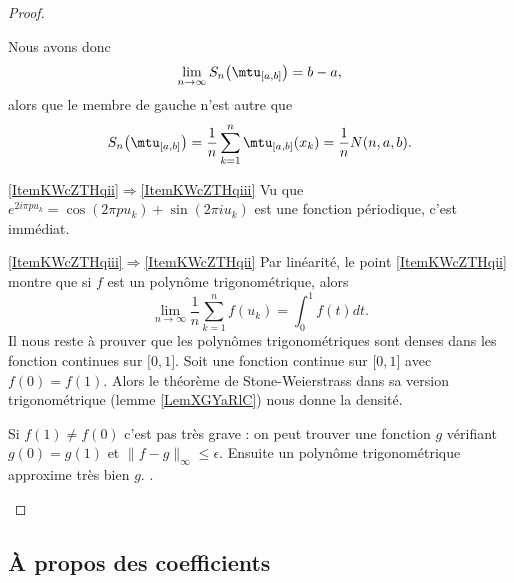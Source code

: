 \begin{proof}
\begin{subproof}
    Nous avons donc
    \begin{equation}
        \lim_{n\to \infty} S_n\big( \mtu_{\mathopen[ a , b \mathclose]} \big)=b-a,
    \end{equation}
    alors que le membre de gauche n'est autre que
    \begin{equation}
        S_n\big( \mtu_{\mathopen[ a , b \mathclose]} \big)=\frac{1}{ n }\sum_{k=1}^n\mtu_{\mathopen[ a , b \mathclose]}(x_k)=\frac{1}{ n }N(n,a,b).
    \end{equation}
    \item[\ref{ItemKWcZTHqii}\( \Rightarrow\)\ref{ItemKWcZTHqiii}]
        Vu que \(  e^{2i\pi pu_k}=\cos(2\pi pu_k)+\sin(2\pi iu_k)\) est une fonction périodique, c'est immédiat.
    \item[\ref{ItemKWcZTHqiii}\( \Rightarrow\)\ref{ItemKWcZTHqii}]
        Par linéarité, le point \ref{ItemKWcZTHqii} montre que si \( f\) est un polynôme trigonométrique, alors
        \begin{equation}
            \lim_{n\to \infty} \frac{1}{ n }\sum_{k=1}^nf(u_k)=\int_0^1f(t)dt.
        \end{equation}
        Il nous reste à prouver que les polynômes trigonométriques sont denses dans les fonction continues sur \( \mathopen[ 0 , 1 \mathclose]\). Soit une fonction continue sur \( \mathopen[ 0 , 1 \mathclose]\) avec \( f(0)=f(1)\). Alors le théorème de Stone-Weierstrass dans sa version trigonométrique (lemme \ref{LemXGYaRlC}) nous donne la densité.

        Si \( f(1)\neq f(0)\) c'est pas très grave : on peut trouver une fonction \( g\) vérifiant \( g(0)=g(1) \) et \( \| f-g \|_{\infty}\leq \epsilon\). Ensuite un polynôme trigonométrique approxime très bien \( g\).
        .
    \end{subproof}
\end{proof}

\subsection{À propos des coefficients}

